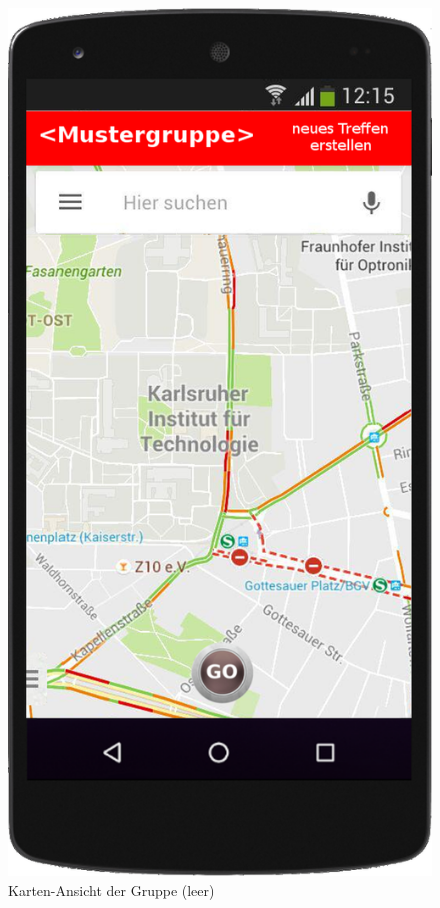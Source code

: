 \begin{figure}
	\caption{Karten-Ansicht der Gruppe (leer)}
	\includegraphics[scale =0.2]{resources/images/handy/map_leer_admin.png}
\end{figure}

